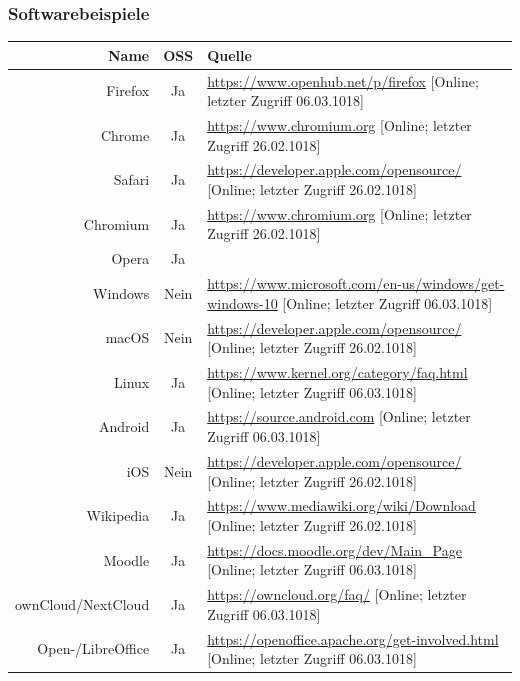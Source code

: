 \documentclass[a4paper]{article}
\begin{document}
			 \subsubsection{Softwarebeispiele}
			     \begin{table}[!htbp]
			         \centering
			         \begin{tabularx}{\textwidth}{rcX}
			               Name & OSS & Quelle\\\hline\hline
			               Firefox & Ja & \tiny\url{https://www.openhub.net/p/firefox} [Online; letzter Zugriff 06.03.1018] \\
			               Chrome & Ja & \tiny\url{https://www.chromium.org} [Online; letzter Zugriff 26.02.1018] \\
			               Safari & Ja & \tiny\url{https://developer.apple.com/opensource/} [Online; letzter Zugriff 26.02.1018]\\
			               Chromium & Ja & \tiny\url{https://www.chromium.org} [Online; letzter Zugriff 26.02.1018] \\
			               Opera & Ja & \\\hline
			               Windows & Nein & \tiny\url{https://www.microsoft.com/en-us/windows/get-windows-10} [Online; letzter Zugriff 06.03.1018]\\
			               macOS & Nein & \tiny\url{https://developer.apple.com/opensource/} [Online; letzter Zugriff 26.02.1018] \\
			               Linux & Ja & \tiny\url{https://www.kernel.org/category/faq.html} [Online; letzter Zugriff 06.03.1018] \\
			               Android & Ja & \tiny\url{https://source.android.com} [Online; letzter Zugriff 06.03.1018] \\
			               iOS & Nein & \tiny\url{https://developer.apple.com/opensource/} [Online; letzter Zugriff 26.02.1018] \\\hline
			               Wikipedia & Ja & \tiny\url{https://www.mediawiki.org/wiki/Download} [Online; letzter Zugriff 26.02.1018]\\
			               Moodle & Ja & \tiny\url{https://docs.moodle.org/dev/Main_Page} [Online; letzter Zugriff 06.03.1018] \\
			               ownCloud/NextCloud & Ja & \tiny\url{https://owncloud.org/faq/} [Online; letzter Zugriff 06.03.1018] \\\hline
			               Open-/LibreOffice & Ja & \tiny\url{https://openoffice.apache.org/get-involved.html} [Online; letzter Zugriff 06.03.1018] \\

\end{tabularx}
\end{table}
\end{document}
